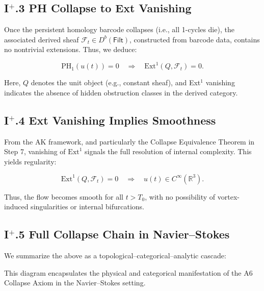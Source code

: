 \documentclass[11pt]{article}
\begin{document}
\subsection*{I$^+$.3 PH Collapse to Ext Vanishing}

Once the persistent homology barcode collapses (i.e., all 1-cycles die),  
the associated derived sheaf \( \mathcal{F}_t \in D^b(\mathsf{Filt}) \),  
constructed from barcode data, contains no nontrivial extensions.  
Thus, we deduce:

\[
\mathrm{PH}_1(u(t)) = 0 \quad \Rightarrow \quad \mathrm{Ext}^1(Q, \mathcal{F}_t) = 0.
\]

Here, \( Q \) denotes the unit object (e.g., constant sheaf), and Ext$^1$ vanishing indicates  
the absence of hidden obstruction classes in the derived category.

\subsection*{I$^+$.4 Ext Vanishing Implies Smoothness}

From the AK framework, and particularly the Collapse Equivalence Theorem in Step 7,  
vanishing of \( \mathrm{Ext}^1 \) signals the full resolution of internal complexity.  
This yields regularity:

\[
\mathrm{Ext}^1(Q, \mathcal{F}_t) = 0 \quad \Rightarrow \quad u(t) \in C^\infty(\mathbb{R}^3).
\]

Thus, the flow becomes smooth for all \( t > T_0 \), with no possibility  
of vortex-induced singularities or internal bifurcations.

\subsection*{I$^+$.5 Full Collapse Chain in Navier--Stokes}

We summarize the above as a topological–categorical–analytic cascade:

\begin{center}
\end{center}

This diagram encapsulates the physical and categorical manifestation  
of the A6 Collapse Axiom in the Navier--Stokes setting.
\end{document}
